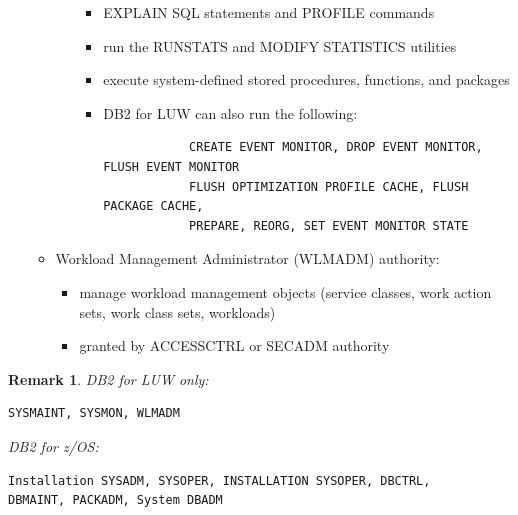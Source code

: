 \documentclass{article}
\newtheorem*{remark}{Remark}
\begin{document}
\begin{itemize}
\begin{itemize}
\begin{itemize}
		\begin{itemize}
		\item EXPLAIN SQL statements and PROFILE commands
		\item run the RUNSTATS and MODIFY STATISTICS utilities
		\item execute system-defined stored procedures, functions, and packages
		\item DB2 for LUW can also run the following:
			\begin{verbatim}
			CREATE EVENT MONITOR, DROP EVENT MONITOR, FLUSH EVENT MONITOR
			FLUSH OPTIMIZATION PROFILE CACHE, FLUSH PACKAGE CACHE,
			PREPARE, REORG, SET EVENT MONITOR STATE
			\end{verbatim}
		\end{itemize}
	\end{itemize}
\item Workload Management Administrator (WLMADM) authority:
	\begin{itemize}
	\item manage workload management objects (service classes, work action sets, work class sets,
	workloads)
	\item granted by ACCESSCTRL or SECADM authority
	\end{itemize}
\end{itemize}
\end{itemize}

\begin{remark}
DB2 for LUW only:
\begin{verbatim}
SYSMAINT, SYSMON, WLMADM
\end{verbatim}
DB2 for z/OS:
\begin{verbatim}
Installation SYSADM, SYSOPER, INSTALLATION SYSOPER, DBCTRL, 
DBMAINT, PACKADM, System DBADM
\end{verbatim}
\end{remark}

\newpage
\end{document}
